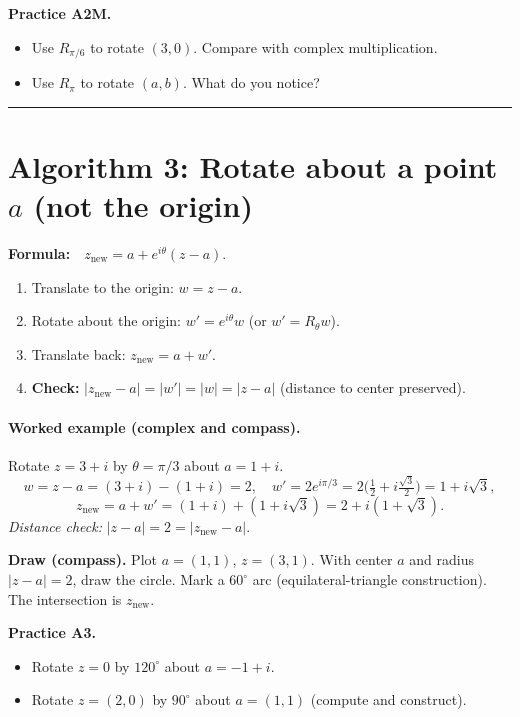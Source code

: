 \documentclass[11pt]{article}
\begin{document}
\medskip
\noindent\textbf{Practice A2M.}
\begin{itemize}
  \item Use \(R_{\pi/6}\) to rotate \((3,0)\). Compare with complex multiplication.
  \item Use \(R_{\pi}\) to rotate \((a,b)\). What do you notice?
\end{itemize}

\bigskip
\hrule
\bigskip

\section*{Algorithm 3: Rotate about a point \(a\) (not the origin)}
\textbf{Formula:}\ \ \(\displaystyle z_{\text{new}}=a+e^{i\theta}(z-a)\).

\begin{enumerate}[label=\textbf{Step \arabic*.}]
  \item Translate to the origin: \(w=z-a\).
  \item Rotate about the origin: \(w'=e^{i\theta}w\) (or \(w'=R_\theta w\)).
  \item Translate back: \(z_{\text{new}}=a+w'\).
  \item \textbf{Check:} \(|z_{\text{new}}-a|=|w'|=|w|=|z-a|\) (distance to center preserved).
\end{enumerate}

\paragraph{Worked example (complex and compass).}
Rotate \(z=3+i\) by \(\theta=\pi/3\) about \(a=1+i\).
\[
w=z-a=(3+i)-(1+i)=2,\quad
w'=2e^{i\pi/3}=2\Big(\tfrac12+i\tfrac{\sqrt3}{2}\Big)=1+i\sqrt3,
\]
\[
z_{\text{new}}=a+w'=(1+i)+(1+i\sqrt3)=2+i(1+\sqrt3).
\]
\emph{Distance check:} \(|z-a|=2=|z_{\text{new}}-a|\).

\medskip
\noindent\textbf{Draw (compass).} Plot \(a=(1,1)\), \(z=(3,1)\). With center \(a\) and radius \(|z-a|=2\), draw the circle. Mark a \(60^\circ\) arc (equilateral-triangle construction). The intersection is \(z_{\text{new}}\).

\medskip
\noindent\textbf{Practice A3.}
\begin{itemize}
  \item Rotate \(z=0\) by \(120^\circ\) about \(a=-1+i\).
  \item Rotate \(z=(2,0)\) by \(90^\circ\) about \(a=(1,1)\) (compute and construct).
\end{itemize}
\end{document}
